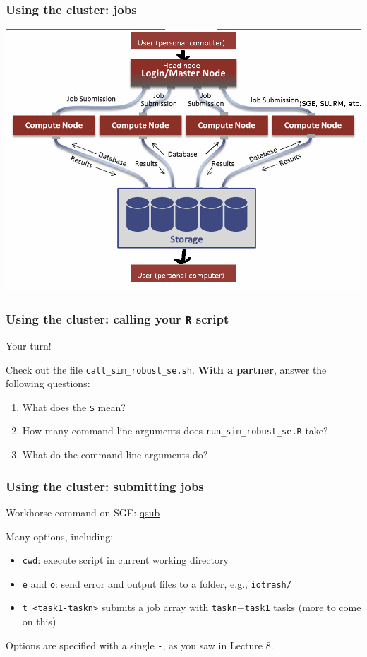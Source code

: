 \documentclass[12pt, 
hyperref={colorlinks=true, linkcolor=BlueViolet, urlcolor=BlueViolet},dvipsnames]{beamer}
\begin{document}
\begin{frame}
\frametitle{Using the cluster: jobs}
\begin{center}
\includegraphics[width = 1\textwidth]{plots/hpc_system.png}
\end{center}
\end{frame}

\begin{frame}
\frametitle{Using the cluster: calling your \texttt{R} script}

Your turn!

Check out the file \texttt{call\_sim\_robust\_se.sh}. \textbf{With a partner}, answer the following questions: \vspace{-0.3cm}
\begin{enumerate}
\item What does the \texttt{\$} mean?
\item How many command-line arguments does \texttt{run\_sim\_robust\_se.R} take?
\item What do the command-line arguments do?
\end{enumerate}
\end{frame}

\begin{frame}
\frametitle{Using the cluster: submitting jobs}
Workhorse command on SGE: \href{http://gridscheduler.sourceforge.net/htmlman/htmlman1/qsub.html}{qsub}

Many options, including: \vspace{-0.3cm} \pause
\begin{itemize}
\item \texttt{cwd}: execute script in current working directory \pause
\item \texttt{e} and \texttt{o}: send error and output files to a folder, e.g., \texttt{iotrash/} \pause
\item \texttt{t <task1-taskn>} submits a job array with \texttt{taskn}$-$\texttt{task1} tasks \pause (more to come on this)
\end{itemize}

Options are specified with a single \texttt{-}, as you saw in Lecture 8.
\end{frame}
\end{document}
